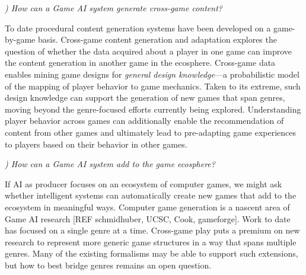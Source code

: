 \documentclass[conference]{IEEEtran}
\newcounter{questionno}
\newcommand{\subsubsectionx}[1]{{\em {\arabic{questionno}) #1}}
	\addtocounter{questionno}{1}
	}
\begin{document}
\subsubsectionx{How can a Game AI system generate cross-game content?}
%
To date procedural content generation systems have been developed on a game-by-game basis.
Cross-game content generation and adaptation explores the question of whether the data acquired about a player in one game can improve the content generation in another game in the ecosphere.
Cross-game data enables mining game designs for {\em general design knowledge}---a probabilistic model of the mapping of player behavior to game mechanics. 
Taken to its extreme, such design knowledge can support the generation of new games that span genres, moving beyond the genre-focused efforts currently being explored. 
Understanding player behavior across games can additionally enable the recommendation of content from other games and ultimately lead to pre-adapting game experiences to players based on their behavior in other games. 

\subsubsectionx{How can a Game AI system add to the game ecosphere?}
%
If AI as producer focuses on an ecosystem of computer games, we might ask whether intelligent systems can automatically create new games that add to the ecosystem in meaningful ways.
Computer game generation is a nascent area of Game AI research [REF schmidhuber, UCSC, Cook, gameforge].
Work to date has focused on a single genre at a time. 
Cross-game play puts a premium on new research to represent more generic game structures in a way that spans multiple genres. Many of the existing formalisms may be able to support such extensions, but how to best bridge genres remains an open question.

\end{document}
